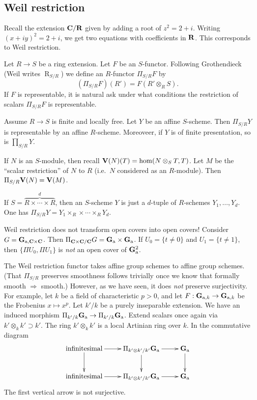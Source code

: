 \documentclass{article}
\begin{document}
\subsection{Weil restriction}

Recall the extension $\mathbf{C}/\mathbf{R}$ given by adding a root of $z^2=2+i$. 
Writing $(x+i y)^2 = 2+i$, we get two equations with coefficients in $\mathbf{R}$. 
This corresponds to Weil restriction. 

Let $R\to S$ be a ring extension. Let $F$ be an $S$-functor. Following 
Grothendieck (Weil writes $\operatorname{R}_{S/R}$) we define an $R$-functor 
$\Pi_{S/R} F$ by 
\[
  (\Pi_{S/R} F)(R') = F(R'\otimes_R S) .
\]
If $F$ is representable, it is natural ask under what conditions the 
restriction of scalars $\Pi_{S/R} F$ is representable. 

\begin{theorem}
Assume $R\to S$ is finite and locally free. Let $Y$ be an affine $S$-scheme. 
Then $\Pi_{S/R} Y$ is representable by an affine $R$-scheme. Moreoveer, if 
$Y$ is of finite presentation, so is $\prod_{S/R} Y$. 
\end{theorem}

\begin{example}
If $N$ is an $S$-module, then recall $\mathbf{V}(N)(T) = \hom(N\otimes_S T,T)$. Let 
$M$ be the ``scalar restriction'' of $N$ to $R$ (i.e.\ $N$ considered as an 
$R$-module). Then $\Pi_{S/R} \mathbf{V}(N) = \mathbf{V}(M)$. 
\end{example}

If $S=\overbrace{R\times \cdots \times R}^d$, then an $S$-scheme $Y$ is just a 
$d$-tuple of $R$-schemes $Y_1,\dots,Y_d$. One has 
$\Pi_{S/R} Y = Y_1\times_R \times \cdots \times_R Y_d$. 

Weil restriction does not transform open covers into open covers! Consider 
$G=\mathbf{G}_{\mathrm{a}, \mathbf{C}\times \mathbf{C}}$. Then 
$\Pi_{\mathbf{C}\times \mathbf{C}/\mathbf{C}} G = \mathbf{G}_{\mathrm{a}} \times \mathbf{G}_{\mathrm{a}}$. If 
$U_0=\{t\ne 0\}$ and $U_1=\{t\ne 1\}$, then 
$\{\Pi U_0,\Pi U_1\}$ is \emph{not} an open cover of $\mathbf{G}_{\mathrm{a}}^2$. 

The Weil restriction functor takes affine group schemes to affine group 
schemes. (That $\Pi_{S/R}$ preserves smoothness follows trivially once we 
know that formally smooth $\Rightarrow$ smooth.) However, as we have seen, 
it does \emph{not} preserve surjectivity. For example, let $k$ be a field 
of characteristic $p>0$, and let $F:\mathbf{G}_{\mathrm{a},k} \to \mathbf{G}_{\mathrm{a},k}$ be the 
Frobenius $x\mapsto x^p$. Let $k'/k$ be a purely inseparable extension. We have 
an induced morphism $\Pi_{k'/k} \mathbf{G}_{\mathrm{a}} \to \Pi_{k'/k} \mathbf{G}_{\mathrm{a}}$. 
Extend scalars once again via $k'\otimes_k k' \supset k'$. The ring 
$k'\otimes_k k'$ is a local Artinian ring over $k$. In the 
commutative diagram 
\[\xymatrix{
  \text{infinitesimal} \ar[r] \ar[d] 
    & \Pi_{k'\otimes k' / k'} \dG_\additive \ar[r] \ar[d] 
    & \dG_\additive \ar[d] \\
  \text{infinitesimal} \ar[r] 
    & \Pi_{k'\otimes k' / k'} \dG_\additive \ar[r] 
    & \dG_\additive
}\]
The first vertical arrow is not surjective. 
\end{document}
